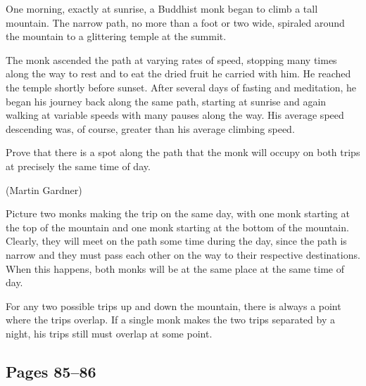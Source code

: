 \documentclass[letterpaper, landscape]{exam}
\begin{document}
\begin{questions}
\begin{solution}
    \end{solution}


    \question{}

      One morning, exactly at sunrise, a Buddhist monk began to climb a tall mountain.  The narrow path, no more than a
      foot or two wide, spiraled around the mountain to a glittering temple at the summit.

      The monk ascended the path at varying rates of speed, stopping many times along the way to rest and to eat the dried
      fruit he carried with him.  He reached the temple shortly before sunset.  After several days of fasting and
      meditation, he began his journey back along the same path, starting at sunrise and again walking at variable speeds
      with many pauses along the way.  His average speed descending was, of course, greater than his average climbing
      speed.

      Prove that there is a spot along the path that the monk will occupy on both trips at precisely the same time of day.

      (Martin Gardner)

      \begin{solution}
        Picture two monks making the trip on the same day, with one monk starting at the top of the mountain and one monk
        starting at the bottom of the mountain.  Clearly, they will meet on the path some time during the day, since the
        path is narrow and they must pass each other on the way to their respective destinations.  When this happens, both
        monks will be at the same place at the same time of day.  

        For any two possible trips up and down the mountain, there is always a point where the trips overlap.  If a
        single monk makes the two trips separated by a night, his trips still must overlap at some point.

      \end{solution}

  \end{questions}

  \ifprintanswers{}

    \subsection{Pages 85--86} 
\end{document}
